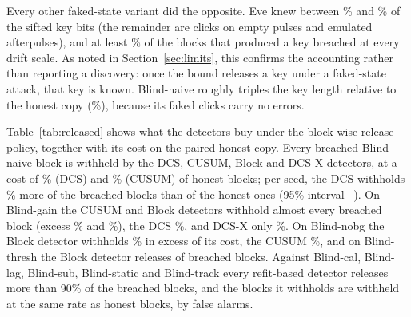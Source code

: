 Every other faked-state variant did the opposite. Eve knew between \blindKnownMin\% and \blindKnownMax\% of the sifted key bits (the remainder are clicks on empty pulses and emulated afterpulses), and at least \breachGivenPosMin\% of the blocks that produced a key breached at every drift scale. As noted in Section~\ref{sec:limits}, this confirms the accounting rather than reporting a discovery: once the bound releases a key under a faked-state attack, that key is known. Blind-naive roughly triples the key length relative to the honest copy (\dellNaiveDOne\%), because its faked clicks carry no errors.

Table~\ref{tab:released} shows what the detectors buy under the block-wise release policy, together with its cost on the paired honest copy. Every breached Blind-naive block is withheld by the DCS, CUSUM, Block and DCS-X detectors, at a cost of \hwNaiveDCSDOne\% (DCS) and \hwNaiveCUSUMDOne\% (CUSUM) of honest blocks; per seed, the DCS withholds \exwNaiveDCSDOne\% more of the breached blocks than of the honest ones (95\% interval \exwloNaiveDCSDOne--\exwhiNaiveDCSDOne). On Blind-gain the CUSUM and Block detectors withhold almost every breached block (excess \exwGainCUSUMDOne\% and \exwGainBlockDOne\%), the DCS \exwGainDCSDOne\%, and DCS-X only \exwGainDCSXDOne\%. On Blind-nobg the Block detector withholds \exwNodarkBlockDOne\% in excess of its cost, the CUSUM \exwNodarkCUSUMDOne\%, and on Blind-thresh the Block detector releases \relThreshBlockDOne{} of \nbreachThreshDOne{} breached blocks. Against Blind-cal, Blind-lag, Blind-sub, Blind-static and Blind-track every refit-based detector releases more than 90\% of the breached blocks, and the blocks it withholds are withheld at the same rate as honest blocks, by false alarms.

\begin{table}[t]
\centering
\caption{Finite-key audit at $d=1$ over all complete blocks inside the attack on a fixed grid (\nbreachNaiveDOne{} blocks per scenario over \nSeeds{} seeds, \nBlocksHonestDOne{} for the honest streams). $K_E/n_Z$ is the ratio of summed known bits to summed sifted key bits; ``Breach'' is the share of blocks satisfying (\ref{eq:breach}).}\label{tab:key}
\small
\end{table}

\begin{table}[t]
\centering
\caption{Breached blocks over \nSeeds{} seeds at $d=1$, how many of them each detector would still have released under the block-wise policy (a block with an alarm in any of its windows is withheld; fewer is better), and the share of the paired honest blocks that the same policy withholds (the cost of false alarms).}\label{tab:released}
\small\resizebox{\linewidth}{!}{}
\end{table}


